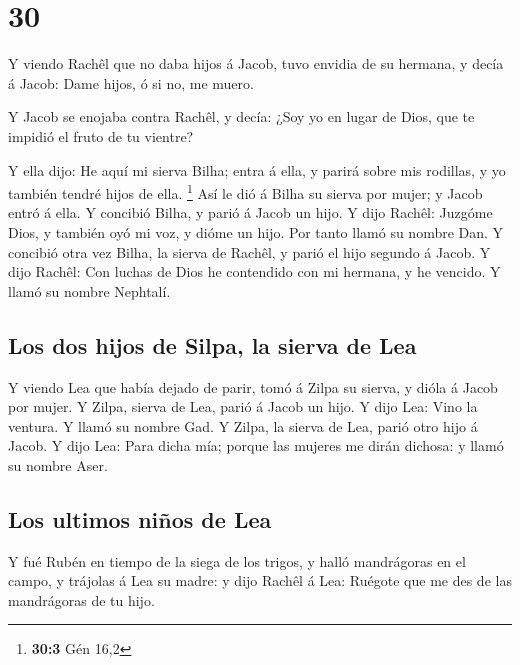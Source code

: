 \hypertarget{section-29}{%
\section{30}\label{section-29}}

 Y viendo Rachêl que no daba hijos á Jacob, tuvo envidia
de su hermana, y decía á Jacob: Dame hijos, ó si no, me muero.

 Y Jacob se enojaba contra Rachêl, y decía: ¿Soy yo en
lugar de Dios, que te impidió el fruto de tu vientre?

 Y ella dijo: He aquí mi sierva Bilha; entra á ella, y
parirá sobre mis rodillas, y yo también tendré hijos de ella.
\footnote{\textbf{30:3} Gén 16,2}  Así le dió á Bilha su
sierva por mujer; y Jacob entró á ella.  Y concibió Bilha,
y parió á Jacob un hijo.  Y dijo Rachêl: Juzgóme Dios, y
también oyó mi voz, y dióme un hijo. Por tanto llamó su nombre Dan.
 Y concibió otra vez Bilha, la sierva de Rachêl, y parió
el hijo segundo á Jacob.  Y dijo Rachêl: Con luchas de
Dios he contendido con mi hermana, y he vencido. Y llamó su nombre
Nephtalí.

\hypertarget{los-dos-hijos-de-silpa-la-sierva-de-lea}{%
\subsection{Los dos hijos de Silpa, la sierva de
Lea}\label{los-dos-hijos-de-silpa-la-sierva-de-lea}}

 Y viendo Lea que había dejado de parir, tomó á Zilpa su
sierva, y dióla á Jacob por mujer.  Y Zilpa, sierva de
Lea, parió á Jacob un hijo.  Y dijo Lea: Vino la ventura.
Y llamó su nombre Gad.  Y Zilpa, la sierva de Lea, parió
otro hijo á Jacob.  Y dijo Lea: Para dicha mía; porque
las mujeres me dirán dichosa: y llamó su nombre Aser.

\hypertarget{los-ultimos-niuxf1os-de-lea}{%
\subsection{Los ultimos niños de
Lea}\label{los-ultimos-niuxf1os-de-lea}}

 Y fué Rubén en tiempo de la siega de los trigos, y halló
mandrágoras en el campo, y trájolas á Lea su madre: y dijo Rachêl á Lea:
Ruégote que me des de las mandrágoras de tu hijo.

